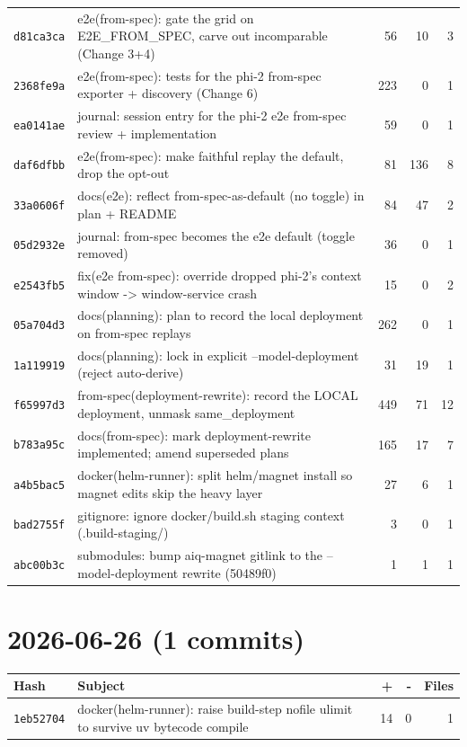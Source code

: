 \begin{longtable}{@{}p{}p{}r r r@{}}
\texttt{d81ca3ca} & e2e(from-spec): gate the grid on E2E\_FROM\_SPEC, carve out incomparable (Change 3+4) & 56 & 10 & 3 \\
\texttt{2368fe9a} & e2e(from-spec): tests for the phi-2 from-spec exporter + discovery (Change 6) & 223 & 0 & 1 \\
\texttt{ea0141ae} & journal: session entry for the phi-2 e2e from-spec review + implementation & 59 & 0 & 1 \\
\texttt{daf6dfbb} & e2e(from-spec): make faithful replay the default, drop the opt-out & 81 & 136 & 8 \\
\texttt{33a0606f} & docs(e2e): reflect from-spec-as-default (no toggle) in plan + README & 84 & 47 & 2 \\
\texttt{05d2932e} & journal: from-spec becomes the e2e default (toggle removed) & 36 & 0 & 1 \\
\texttt{e2543fb5} & fix(e2e from-spec): override dropped phi-2's context window -> window-service crash & 15 & 0 & 2 \\
\texttt{05a704d3} & docs(planning): plan to record the local deployment on from-spec replays & 262 & 0 & 1 \\
\texttt{1a119919} & docs(planning): lock in explicit --model-deployment (reject auto-derive) & 31 & 19 & 1 \\
\texttt{f65997d3} & from-spec(deployment-rewrite): record the LOCAL deployment, unmask same\_deployment & 449 & 71 & 12 \\
\texttt{b783a95c} & docs(from-spec): mark deployment-rewrite implemented; amend superseded plans & 165 & 17 & 7 \\
\texttt{a4b5bac5} & docker(helm-runner): split helm/magnet install so magnet edits skip the heavy layer & 27 & 6 & 1 \\
\texttt{bad2755f} & gitignore: ignore docker/build.sh staging context (.build-staging/) & 3 & 0 & 1 \\
\texttt{abc00b3c} & submodules: bump aiq-magnet gitlink to the --model-deployment rewrite (50489f0) & 1 & 1 & 1 \\
\bottomrule\end{longtable}
\section*{2026-06-26 (1 commits)}
\begin{longtable}{@{}p{}p{}r r r@{}}
\toprule Hash & Subject & + & - & Files \\ \midrule\endhead
\texttt{1eb52704} & docker(helm-runner): raise build-step nofile ulimit to survive uv bytecode compile & 14 & 0 & 1 \\
\bottomrule\end{longtable}
